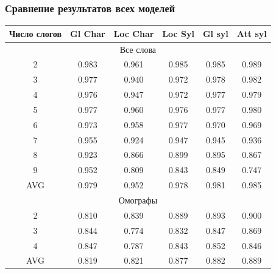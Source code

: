 \documentclass[russian]{beamer}
\begin{document}
\begin{frame}
\frametitle{Сравнение результатов всех моделей}
\begin{table}[H]	
	\begin{small}
		\begin{center}
			\begin{tabular}{|c|c|c|c| c| c |}
				\hline
				Число слогов & Gl Char & Loc Char & Loc Syl & Gl syl & Att syl \\ \hline
							\multicolumn{6}{|c|}{Все слова}                          \\ \hline
				
				2       &       0.983       &      0.961       &      0.985      & 0.985             & 0.989              \\ \hline
				3       &       0.977       &      0.940       &      0.972      & 0.978             & 0.982              \\ \hline
				4       &       0.976       &      0.947       &      0.972      & 0.977             & 0.979              \\ \hline
				5       &       0.977       &      0.960       &      0.976      & 0.977             & 0.980              \\ \hline
				6       &       0.973       &      0.958       &      0.977      & 0.970             & 0.969              \\ \hline
				7       &       0.955       &      0.924       &      0.947      & 0.945             & 0.936              \\ \hline
				8       &       0.923       &      0.866       &      0.899      & 0.895             & 0.867              \\ \hline
				9       &       0.952       &      0.809       &      0.843      & 0.849             & 0.747              \\ \hline
				AVG    &       0.979       &      0.952       &      0.978      & 0.981             & 0.985              \\ \hline
							\multicolumn{6}{|c|}{Омографы}                          \\ \hline
				
				2       &       0.810       &      0.839       &      0.889      & 0.893             & 0.900              \\ \hline
				3       &       0.844       &      0.774       &      0.832      & 0.847             & 0.869              \\ \hline
				4       &       0.847       &      0.787       &      0.843      & 0.852             & 0.846              \\ \hline
				AVG    &       0.819       &      0.821       &      0.877      & 0.882             & 0.889              \\ \hline
			\end{tabular}
		\end{center}
	\end{small}
\end{table}	

\end{frame}
\end{document}
